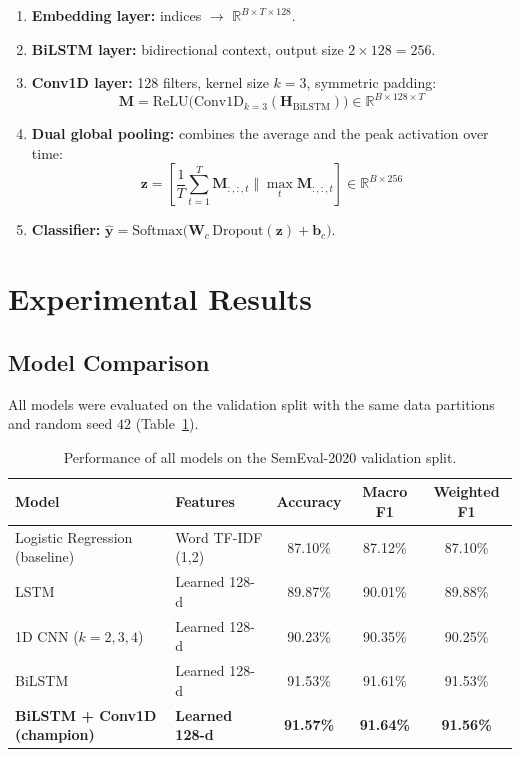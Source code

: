 \documentclass[11pt,a4paper]{article}
\begin{document}
\begin{enumerate}
    \item \textbf{Embedding layer:} indices $\rightarrow$ $\mathbb{R}^{B\times T\times128}$.
    \item \textbf{BiLSTM layer:} bidirectional context, output size $2\times128=256$.
    \item \textbf{Conv1D layer:} 128 filters, kernel size $k=3$, symmetric padding:
    \begin{equation}
        \mathbf{M} = \text{ReLU}\big(\text{Conv1D}_{k=3}(\mathbf{H}_{\text{BiLSTM}})\big) \in \mathbb{R}^{B\times128\times T}
    \end{equation}
    \item \textbf{Dual global pooling:} combines the average and the peak activation over time:
    \begin{equation}
        \mathbf{z} = \left[\frac{1}{T}\sum_{t=1}^{T}\mathbf{M}_{:,:,t} \;\Big\Vert\; \max_{t}\mathbf{M}_{:,:,t}\right] \in \mathbb{R}^{B\times256}
    \end{equation}
    \item \textbf{Classifier:} $\hat{\mathbf{y}}=\text{Softmax}\big(\mathbf{W}_c\,\text{Dropout}(\mathbf{z})+\mathbf{b}_c\big)$.
\end{enumerate}

\section{Experimental Results}

\subsection{Model Comparison}
All models were evaluated on the validation split with the same data partitions and random seed $42$ (Table~\ref{tab:model_results}).

\begin{table}[htbp]
\centering
\small
\setlength{\tabcolsep}{4pt}
\begin{tabular}{llccc}
\toprule
\textbf{Model} & \textbf{Features} & \textbf{Accuracy} & \textbf{Macro F1} & \textbf{Weighted F1} \\
\midrule
Logistic Regression (baseline) & Word TF-IDF (1,2)  & 87.10\% & 87.12\% & 87.10\% \\
LSTM                           & Learned 128-d      & 89.87\% & 90.01\% & 89.88\% \\
1D CNN ($k=2,3,4$)             & Learned 128-d      & 90.23\% & 90.35\% & 90.25\% \\
BiLSTM                         & Learned 128-d      & 91.53\% & 91.61\% & 91.53\% \\
\rowcolor{champion}
\textbf{BiLSTM + Conv1D (champion)} & \textbf{Learned 128-d} & \textbf{91.57\%} & \textbf{91.64\%} & \textbf{91.56\%} \\
\bottomrule
\end{tabular}
\caption{Performance of all models on the SemEval-2020 validation split.}
\label{tab:model_results}
\end{table}
\end{document}
